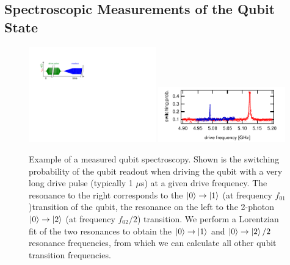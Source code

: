 \subsection{Spectroscopic Measurements of the Qubit State}

\begin{figure}[ht!]
\centering
\includegraphics[width=0.49\textwidth]{"./material/figures/measurement/qubit_spectroscopy"}
\includegraphics[width=0.49\textwidth]{"./data/ct5/2011_04_21 - grover and tomo/example - qubit 2 spectroscopy"}
\caption[]{Example of a measured qubit spectroscopy. Shown is the switching probability of the qubit readout when driving the qubit with a very long drive pulse (typically 1 $\mu$s) at a given drive frequency. The resonance to the right corresponds to the $\left| 0 \right>\to\left| 1 \right>$ (at frequency $f_{01}$)transition of the qubit, the resonance on the left to the 2-photon $\left| 0 \right>\to\left| 2 \right>$ (at frequency $f_{02}/2$) transition. We perform a Lorentzian fit of the two resonances to obtain the $\left| 0 \right>\to\left| 1 \right>$ and $\left| 0 \right>\to\left| 2 \right>/2$ resonance frequencies, from which we can calculate all other qubit transition frequencies.}
\label{fig:qubit_spectroscopy_example}
\end{figure}

